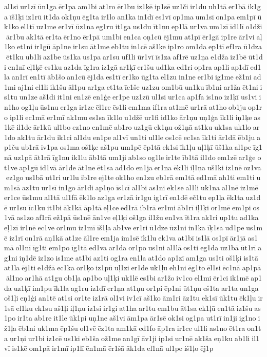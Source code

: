 al1si ur1zī ūn1ga ēr1pa am1bi at1ro ēr1bu iz1ķē ip1sē uz1či ir1du uh1tā er1bā ik1ga īš1ķi iz1rū it1da ok1ņu ēg1ta ir1lo an1ka in1dī es1vī op1ma um1sī on1pa em1pī ūk1ko el1tī uz1me er1vī ūz1na eg1ru it1ga us1du īt1ņu ep1lā ur1va um1zī īd1lī o1dži ār1bu ak1tā er1ta ēr1no ēr1pā um1bi en1ca oņ1cū ēj1mu at1pī ēr1gā ip1re ār1vi aļ1ķo et1ni ir1gū āp1ne ir1su āt1me eb1tu in1cē aš1ķe ip1ro om1da ep1tī ef1ra ū1dza ēt1ku ub1li az1be ūs1ka us1pa ar1su uf1li ūr1vī īs1za af1rē uz1ņa e1dža iz1bē ūt1di en1nī eļ1ķē es1ku az1da īg1ra iz1gā ar1ķī er1šu ud1ka ed1ri op1ra ap1li ap1dī ed1la an1rī en1tī āb1šo an1cū ēj1da es1tī er1ko ūg1ta el1zu in1ne er1bi ig1me ež1ni ad1mi aj1ni el1li ik1šu āl1pu ar1ga et1ta īc1še uz1zu om1bū un1ku īb1ni ar1ža ēt1ni is1tu un1ze aš1di it1ni en1zē en1ģe er1pe uz1zū ul1si ur1ca ap1fa is1no iz1ķī us1vi in1ho og1ļu ūs1nu er1ga ir1ze ēl1re ēs1li em1ma if1ra at1mē ur1rā at1ho ob1ju op1ro ip1li ec1mā er1mī ak1mu es1sa īk1lo u1džē ur1fi id1ko ār1ņu uņ1ģa īk1li iņ1ķe as1kē il1de ār1kū ul1bo ez1no en1mē ab1ro uz1gū ek1ņu ož1ņā at1ku uk1sa uk1lo ar1do ak1tu ār1du ik1ci al1du en1pe al1vī un1ti ul1le os1cē ec1sa īk1ti ār1dā ēb1ju ap1ču ub1rā iv1pa os1ma oš1ķe aš1pu um1pē ēp1tā ek1si īk1ļu uļ1ķī ūš1ka al1pe īg1nā uz1pā āt1rā īg1nu ik1lu āb1tā um1ji ab1so og1le ir1te īb1tā il1do em1zē ar1ģe ot1ve ap1gū id1vā ār1de āt1ne ēt1sa ad1do en1ja er1na ēk1li iļ1ņa uš1ki iz1nē oz1va ez1go us1bā ut1ri ur1lu ib1re ej1te ok1ho en1zu eb1rā em1tā ed1mā ah1ti em1ti um1sā az1tu ur1sī in1go ār1di ap1ņo īs1cī al1bi as1ni ek1se al1li uk1na al1nē iz1mē er1ce ūs1mu al1tā ul1fā ēk1lo az1ga er1zā ir1gu ig1rī en1dē eč1tu ep1ļa ēk1ta uz1dē ur1su īc1ku it1bi āk1kā āp1tā eļ1ce ed1rā ib1rā er1mi āb1rī iļ1ķi or1mē em1pi os1vā as1zo af1rā ež1pā ūs1nē ān1ve eļ1ķi oš1ga il1žu en1va īt1ra ak1ri up1tu ad1ka eļ1zī ir1nē ec1ve or1mu iz1mī īš1ļa ab1ve er1ri ū1dze ūz1ni in1ka īķ1sa ud1pe us1mē iz1rī on1rā aņ1kā at1ze āl1re em1ja im1sē īk1lu ek1va at1bī is1lā os1pī ār1jā as1mā ol1nī īg1ti em1po īg1tā ed1va ar1da or1po us1ni al1lā os1ti eg1da uz1bā ūt1rī ag1ni iņ1dē iz1zo is1me at1bi az1ti og1ra en1la at1do ap1zī am1ga us1ti oš1ķi is1tā at1la ēj1ti e1džā ec1ka or1ķo iz1pū uļ1zi er1de uk1ļu eh1ni ēg1to ēl1si ēc1nā ap1pā āl1no ar1hā at1gu ob1ļa ap1bo uļ1ķi uk1lē es1bi ar1žo iv1co el1mi ēr1ci ik1mē ap1da uz1ķī im1pu īk1la ag1ru iz1dī er1ņa at1ņu or1pi ēp1ni ūt1ņu eš1ta ar1ta un1ga oš1ļi eņ1ģi an1tē at1si or1te iz1rā ol1vi iv1cī aš1ko ām1ri āz1tu ek1sī ūk1tu ēk1ļu ir1sā el1ku ek1su aš1ļi iļ1ņu iz1si ir1gi at1ha ar1tu em1bu āt1sa ek1ļū en1tā iz1šu as1po ir1ta ab1re it1le ūk1pi uņ1ne aš1vi ām1pa ār1sē ok1si og1pa ut1rī in1ji ig1no iž1ļa ēb1ni uk1ma ēp1šu ol1vē ēz1ta am1kā ed1fo āp1ra ir1ce ul1li as1no ēt1ra on1ta ur1ņi ur1bi iz1cē us1ki eb1ša ož1me an1gī āv1ji ip1si ur1nē ak1ša eņ1ku ab1li il1vī is1kē om1pā ir1mī ip1lī ēn1mā ēr1šā āk1da el1nā ul1pe iš1ļo ēj1p